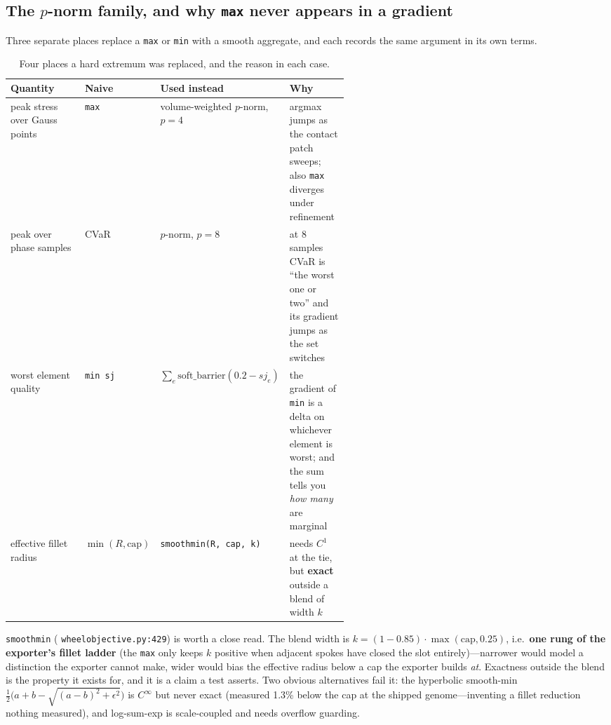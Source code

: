 \documentclass[11pt,a4paper]{article}
\DeclareRobustCommand{\code}[1]{%
  \texttt{\small\def\_{\textunderscore\discretionary{}{}{}}#1}}
\newcommand{\at}[2]{\code{#1:#2}}
\begin{document}
\subsection{The \texorpdfstring{$p$}{p}-norm family, and why \texttt{max} never appears in a gradient}
\label{sec:pnormfamily}

Three separate places replace a \code{max} or \code{min} with a smooth aggregate, and
each records the same argument in its own terms.

\begin{table}[h]
\centering
\small
\begin{tabularx}{\linewidth}{@{}>{\raggedright\arraybackslash}p{0.22\linewidth}
                               >{\raggedright\arraybackslash}p{0.10\linewidth}
                               >{\raggedright\arraybackslash}p{0.24\linewidth}
                               X@{}}
\toprule
\textbf{Quantity} & \textbf{Naive} & \textbf{Used instead} & \textbf{Why} \\
\midrule
peak stress over Gauss points & \code{max} & volume-weighted $p$-norm, $p = 4$ &
  argmax jumps as the contact patch sweeps; also \code{max} diverges under refinement \\
\addlinespace
peak over phase samples & CVaR & $p$-norm, $p = 8$ &
  at 8 samples CVaR is ``the worst one or two'' and its gradient jumps as the set
  switches \\
\addlinespace
worst element quality & \code{min sj} &
  $\sum_e \mathrm{soft\_barrier}(0.2 - sj_e)$ &
  the gradient of \code{min} is a delta on whichever element is worst; and the sum tells
  you \emph{how many} are marginal \\
\addlinespace
effective fillet radius & $\min(R, \mathrm{cap})$ &
  \code{smooth\_min(R, cap, k)} &
  needs $C^1$ at the tie, but \textbf{exact} outside a blend of width $k$ \\
\bottomrule
\end{tabularx}
\caption{Four places a hard extremum was replaced, and the reason in each case.}
\end{table}

\code{smooth\_min} (\at{wheel\_objective.py}{429}) is worth a close read. The blend
width is $k = (1 - 0.85)\cdot\max(\mathrm{cap}, 0.25)$, i.e.\ \textbf{one rung of the
exporter's fillet ladder} (the \code{max} only keeps $k$ positive when adjacent spokes
have closed the slot entirely)---narrower would model a distinction the exporter cannot
make, wider would bias the effective radius below a cap the exporter builds \emph{at}.
Exactness outside the blend is the property it exists for, and it is a claim a test
asserts. Two obvious alternatives fail it: the hyperbolic smooth-min
$\tfrac12\bigl(a + b - \sqrt{(a-b)^2 + \epsilon^2}\bigr)$ is $C^\infty$ but never exact
(measured 1.3\% below the cap at the shipped genome---inventing a fillet reduction
nothing measured), and log-sum-exp is scale-coupled and needs overflow guarding.
\end{document}
